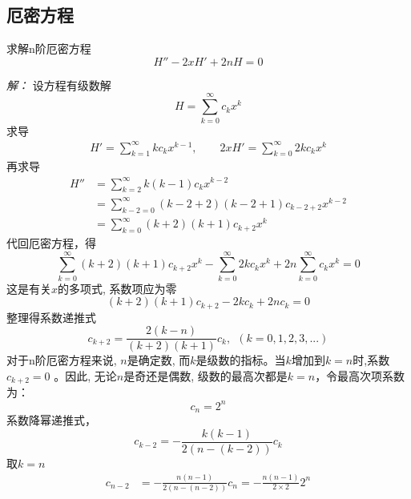 \subsection{厄密方程}
\begin{example}
	求解n阶厄密方程
	\begin{equation}\label{eq:hemfc}
		H'' -2 x H' +2n H=0 
	\end{equation} 
\end{example}
\emph{解：}
	设方程有级数解
	\begin{equation*}
		H=\sum_{k=0}^{\infty} c_k x ^k
	\end{equation*}     
	求导
	$$\begin{aligned}
		H'=\sum_{k=1}^{\infty} k c_k x ^{k-1}, \qquad  
		2 x H' =\sum_{k=0}^{\infty} 2 k c_k x ^{k}
	\end{aligned}$$ 
	再求导
	$$\begin{aligned}
		H''&=\sum_{k=2}^{\infty} k(k-1) c_k x ^{k-2} \\
		   &=\sum_{k-2=0}^{\infty} (k-2+2)(k-2+1) c_{k-2+2} x ^{k-2} \\
		   &=\sum_{k=0}^{\infty} (k+2)(k+1) c_{k+2} x ^{k}
	\end{aligned}$$  
   代回厄密方程，得
   \begin{equation*}
	   \sum_{k=0}^{\infty} (k+2)(k+1) c_{k+2} x ^{k} -\sum_{k=0}^{\infty} 2 k c_k x ^{k} +2n \sum_{k=0}^{\infty} c_k x ^k=0 
   \end{equation*}
   这是有关$x$的多项式, 系数项应为零
   \[(k+2)(k+1) c_{k+2} - 2 k c_k  + 2n c_k =0 \]
   整理得系数递推式
   \begin{equation*}
	   c_{k+2} = \frac{ 2(k-n)}{(k+2)(k+1) } c_k, ~~  \left( k=0,1,2,3, ...  \right)
   \end{equation*} 
	对于n阶厄密方程来说, $n$是确定数, 而$k$是级数的指标。当$k$增加到$k=n$时,系数$c_{k+2} =0 $ 。因此, 无论$n$是奇还是偶数, 级数的最高次都是$k=n$，令最高次项系数为：
	\begin{equation*}
		c_n =2^n
	\end{equation*}
	系数降幂递推式，\begin{equation*}
		c_{k-2} = -\frac{k(k-1) } { 2(n-(k-2))}  c_k
	\end{equation*}   
	取$k=n$
	\begin{equation*}
		\begin{aligned}
			c_{n-2} &=-\frac{n(n-1) } { 2(n-(n-2))}  c_n  = -\frac{n(n-1) } { 2\times2}  2^n 
		\end{aligned}
	\end{equation*} 
